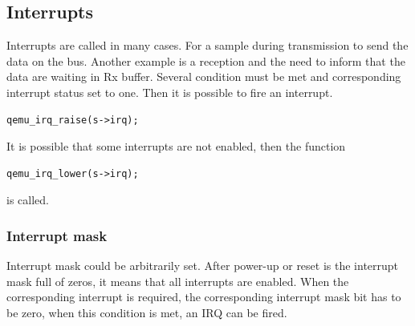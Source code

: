 \documentclass{ctuthesis}
\begin{document}
 \subsection{Interrupts}
 Interrupts are called in many cases. For a sample during transmission to send the data on the bus. Another example is a reception and the need to inform that the data are waiting in Rx buffer. Several condition must be met and corresponding interrupt status set to one. Then it is possible to fire an interrupt.
  \begin{verbatim}qemu_irq_raise(s->irq);\end{verbatim}
It is possible that some interrupts are not enabled, then the function 
  \begin{verbatim}qemu_irq_lower(s->irq);\end{verbatim}
is called.
 
  \subsubsection{Interrupt mask}
  Interrupt mask could be arbitrarily set. After power-up or reset is the interrupt mask full of zeros, it means that all interrupts are enabled. When the corresponding interrupt is required, the corresponding interrupt mask bit has to be zero, when this condition is met, an IRQ can be fired.
  
\end{document}
